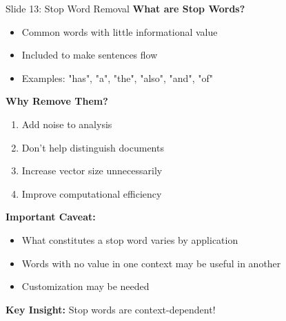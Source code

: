 \documentclass[8pt]{beamer}
\begin{document}
	\begin{frame}{Slide 13: Stop Word Removal}
		\fontsize{6.5}{7.5}\selectfont
		\textbf{What are Stop Words?}
		\begin{itemize}
			\item Common words with little informational value
			\item Included to make sentences flow
			\item Examples: "has", "a", "the", "also", "and", "of"
		\end{itemize}
		
		\vspace{0.1cm}
		\textbf{Why Remove Them?}
		\begin{enumerate}
			\item Add noise to analysis
			\item Don't help distinguish documents
			\item Increase vector size unnecessarily
			\item Improve computational efficiency
		\end{enumerate}
		
		\vspace{0.1cm}
		\textbf{Important Caveat:}
		\begin{itemize}
			\item What constitutes a stop word varies by application
			\item Words with no value in one context may be useful in another
			\item Customization may be needed
		\end{itemize}
		
		\textcolor{myblue}{\textbf{Key Insight:}} Stop words are context-dependent!
	\end{frame}
	
\end{document}

